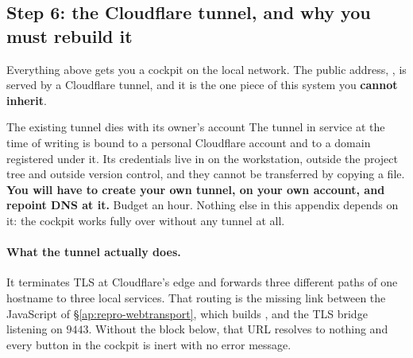 \subsection{Step 6: the Cloudflare tunnel, and why you must rebuild it}
\label{ap:repro-cloudflare}
Everything above gets you a cockpit on the local network. The public address,
, is served by a Cloudflare tunnel, and it
is the one piece of this system you \textbf{cannot inherit}.

\begin{trapbox}{The existing tunnel dies with its owner's account}
The tunnel in service at the time of writing is bound to a personal
Cloudflare account and to a domain registered under it. Its credentials live
in  on the workstation, outside the
project tree and outside version control, and they cannot be transferred by
copying a file. \textbf{You will have to create your own tunnel, on your own
account, and repoint DNS at it.} Budget an hour. Nothing else in this
appendix depends on it: the cockpit works fully over
 without any tunnel at all.
\end{trapbox}

\paragraph{What the tunnel actually does.} It terminates TLS at Cloudflare's
edge and forwards three different paths of one hostname to three local
services. That routing is the missing link between the JavaScript of
\S\ref{ap:repro-webtransport}, which builds
, and the TLS bridge listening on
$9443$. Without the  block below, that URL resolves to nothing
and every button in the cockpit is inert with no error message.

